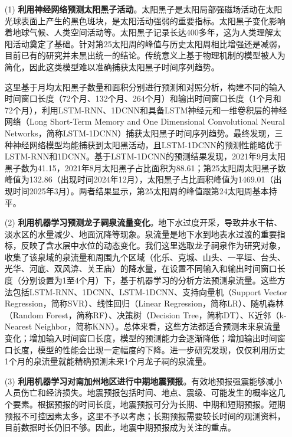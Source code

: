 \begin{enumerate}

  \item[(1)] \textbf{利用神经网络预测太阳黑子活动}。太阳黑子是太阳局部强磁场活动在太阳光球表面上产生的黑色斑块，是太阳活动强弱的重要指标。太阳黑子变化影响着地球气候、人类空间活动等。太阳黑子记录长达400多年，这为人类理解太阳活动奠定了基础。针对第25太阳周的峰值与历史太阳周相比增强还是减弱，目前已有的研究并未黑出统一的结论。传统意义上基于物理机制的模型被人为简化，因此这类模型难以准确捕获太阳黑子时间序列趋势。
  
  这里基于月均太阳黑子数量和面积分别进行预测和对照分析，构建不同的输入时间窗口长度（72个月、132个月、264个月）和输出时间窗口长度（1个月和72个月），利用LSTM-RNN、1DCNN和具备LSTM神经元和一维卷积层的神经网络（Long Short-Term Memory and One Dimensional Convolutional Neural Networks，简称LSTM-1DCNN）捕获太阳黑子时间序列趋势。最终发现，三种神经网络模型均能捕获到太阳黑活动，且LSTM-1DCNN的预测性能略优于LSTM-RNN和1DCNN。基于LSTM-1DCNN的预测结果发现，2021年9月太阳黑子数为41.15，2021年8月太阳黑子占比面积为88.61；第25太阳周太阳黑子数峰值为132.86（出现时间2024年12月），太阳黑子占比面积峰值为1469.01（出现时间2025年3月）。两者结果显示，第25太阳周的峰值跟第24太阳周基本持平。

  \item[{(2)}] \textbf{利用机器学习预测龙子祠泉流量变化}。地下水过度开采，导致井水干枯、淡水区的水量减少、地面沉降等现象。泉流量是地下水到地表水过渡的重要指标，反映了含水层中水位的动态变化。我们这里选取龙子祠泉作为研究对象，收集了该泉域的泉流量和周围九个区域（化乐、克城、山头、一平垣、台头、光华、河底、双风渰、关王庙）的降水量，在设置不同输入和输出时间窗口长度（分别设置为1至4个月）下，基于机器学习的分析方法预测泉流量。这些方法包括LSTM-RNN、1DCNN、LSTM-1DCNN、支持向量机（Support Vector Regression，简称SVR）、线性回归（Linear Regression，简称LR）、随机森林（Random Forest，简称RF）、决策树（Decision Tree，简称DT）、K近邻（k-Nearest Neighbor，简称KNN）。总体来看，这些方法都适合预测未来泉流量变化；增加输入时间窗口长度，模型的预测能力会逐渐降低；增加输出时间窗口长度，模型的性能会出现一定幅度的下降。进一步研究发现，仅仅利用历史1个月的泉流量就能精确预测未来1个月龙子祠的泉流量。
  
  \item[(3)] \textbf{利用机器学习对南加州地区进行中期地震预报}。有效地预报强震能够减小人员伤亡和经济损失。地震预报包括时间、地点、震级、可能发生的概率这几个要素。根据预报的时间长度，地震预报可分为长期、中期和短期预报。短期预报不可控因素太多，这里不予以考虑；长期预报需要较长时间的观测资料，目前数据时长仍旧不够。因此，地震中期预报成为关注的重点。
  

\end{enumerate}
